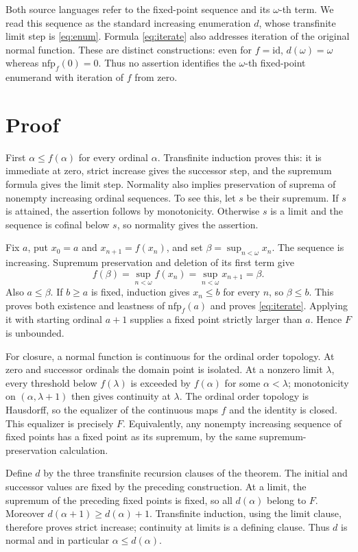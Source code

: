 \documentclass[11pt]{article}
\newcommand{\nfp}{\mathrm{nfp}}
\begin{document}
Both source languages refer to the fixed-point sequence and its
$\omega$-th term. We read this sequence as the standard increasing
enumeration $d$, whose transfinite limit step is \eqref{eq:enum}.
Formula \eqref{eq:iterate} also addresses iteration of the original normal
function. These are distinct constructions: even for $f=\mathrm{id}$,
$d(\omega)=\omega$ whereas $\nfp_f(0)=0$. Thus no assertion identifies
the $\omega$-th fixed-point enumerand with iteration of $f$ from zero.

\section*{Proof}
First $\alpha\leq f(\alpha)$ for every ordinal $\alpha$. Transfinite
induction proves this: it is immediate at zero, strict increase gives the
successor step, and the supremum formula gives the limit step.
Normality also implies preservation of suprema of nonempty increasing
ordinal sequences. To see this, let $s$ be their supremum. If $s$ is
attained, the assertion follows by monotonicity. Otherwise $s$ is a limit
and the sequence is cofinal below $s$, so normality gives the assertion.

Fix $a$, put $x_0=a$ and $x_{n+1}=f(x_n)$, and set
$\beta=\sup_{n<\omega}x_n$. The sequence is increasing. Supremum
preservation and deletion of its first term give
\[
 f(\beta)=\sup_{n<\omega}f(x_n)
          =\sup_{n<\omega}x_{n+1}=\beta.
\]
Also $a\leq\beta$. If $b\geq a$ is fixed, induction gives $x_n\leq b$
for every $n$, so $\beta\leq b$. This proves both existence and leastness
of $\nfp_f(a)$ and proves \eqref{eq:iterate}. Applying it with starting
ordinal $a+1$ supplies a fixed point strictly larger than $a$. Hence $F$
is unbounded.

For closure, a normal function is continuous for the ordinal order topology.
At zero and successor ordinals the domain point is isolated. At a nonzero
limit $\lambda$, every threshold below $f(\lambda)$ is exceeded by
$f(\alpha)$ for some $\alpha<\lambda$; monotonicity on
$(\alpha,\lambda+1)$ then gives continuity at $\lambda$.
The ordinal order topology is Hausdorff, so the equalizer of the continuous
maps $f$ and the identity is closed. This equalizer is precisely $F$.
Equivalently, any nonempty increasing sequence of fixed points has a fixed
point as its supremum, by the same supremum-preservation calculation.

Define $d$ by the three transfinite recursion clauses of the theorem.
The initial and successor values are fixed by the preceding construction.
At a limit, the supremum of the preceding fixed points is fixed, so all
$d(\alpha)$ belong to $F$. Moreover
$d(\alpha+1)\geq d(\alpha)+1$. Transfinite induction, using the limit
clause, therefore proves strict increase; continuity at limits is a defining
clause. Thus $d$ is normal and in particular $\alpha\leq d(\alpha)$.
\end{document}
